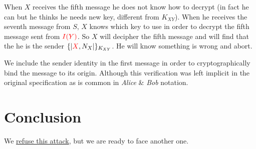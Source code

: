 \documentclass[11pt]{article}
\begin{document}
    When $X$ receives the fifth message he does not know how to decrypt (in fact he can but he thinks he needs new
    key, different from $K_{XY}$). When he receives the seventh message from $S$, $X$ knows which key to use in order to
    decrypt the fifth message sent from $\textcolor{red}{I(Y)}$. So $X$ will decipher the fifth message and will find that
    the he is the sender $\{|\textcolor{red}{X}, N_X|\}_{K_{XY}}$. He will know something is wrong and abort.

    \noindent

    We include the sender identity in the first message in order to cryptographically bind the message to its origin.
    Although this verification was left implicit in the original specification as is common in \textit{Alice} \& \textit{Bob} notation.




    \section{Conclusion}
    We \underline{refuse this attack}, but we are ready to face another one.
\end{document}
